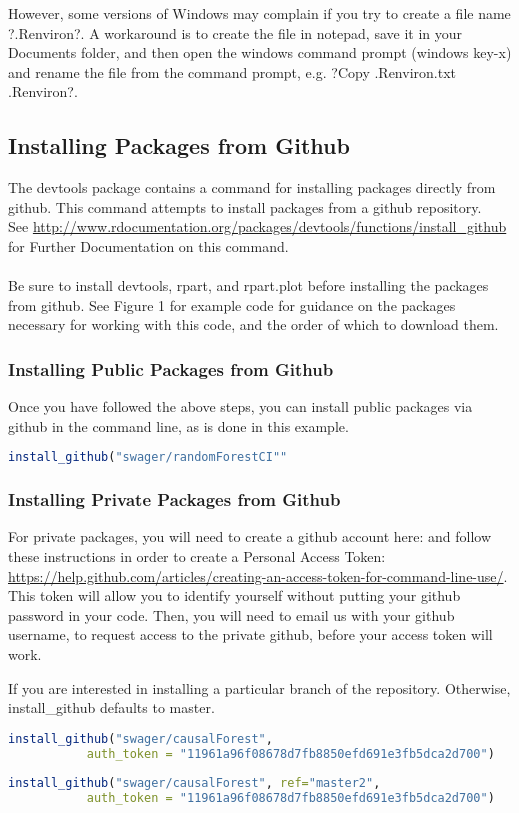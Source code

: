 \documentclass{article}
\begin{document}
However, some versions of Windows may complain if you try to create a file name ?.Renviron?.  A workaround is to create the file in notepad, save it in your Documents folder, and then open the windows command prompt (windows key-x) and rename the file from the command prompt, e.g. ?Copy .Renviron.txt .Renviron?.


\subsection{Installing Packages from Github}
The devtools package contains a command for installing packages directly from github. This command attempts to install packages from a github repository. \\ 
See \url{http://www.rdocumentation.org/packages/devtools/functions/install_github} for Further Documentation on this command. \\ \\
Be sure to install devtools, rpart, and rpart.plot before installing the packages from github. See Figure 1 for example code for guidance on the packages necessary for working with this code, and the order of which to download them. 
\subsubsection{Installing Public Packages from Github}
Once you have followed the above steps, you can install public packages via github in the command line, as is done in this example.
\begin{lstlisting}[language=R]
install_github("swager/randomForestCI""
\end{lstlisting}


\subsubsection{Installing Private Packages from Github}
For private packages, you will need to create a github account here:
and follow these instructions in order to create a Personal Access Token: \url{https://help.github.com/articles/creating-an-access-token-for-command-line-use/}. \\ This token will allow you to identify yourself without putting your github password in your code. Then, you will need to email us with your github username, to request access to the private github, before your access token will work.

If you are interested in installing a particular branch of the repository. Otherwise, install\_github defaults to master. 
\begin{lstlisting}[language=R]
install_github("swager/causalForest", 
           auth_token = "11961a96f08678d7fb8850efd691e3fb5dca2d700") 
    
install_github("swager/causalForest", ref="master2", 
           auth_token = "11961a96f08678d7fb8850efd691e3fb5dca2d700")
\end{lstlisting}
\end{document}
